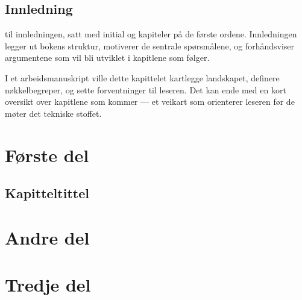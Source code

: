 \documentclass[12pt,twoside,b5paper]{book}
\begin{document}
\chapter{Innledning}
til innledningen, satt med initial og kapiteler på de første ordene. Innledningen legger ut bokens struktur, motiverer de sentrale spørsmålene, og forhåndsviser argumentene som vil bli utviklet i kapitlene som følger.

I et arbeidsmanuskript ville dette kapittelet kartlegge landskapet, definere nøkkelbegreper, og sette forventninger til leseren. Det kan ende med en kort oversikt over kapitlene som kommer --- et veikart som orienterer leseren før de møter det tekniske stoffet.


\part{Første del}

\chapter{Kapitteltittel}



\part{Andre del}


\part{Tredje del}


\backmatter

\printbibliography

\end{document}
